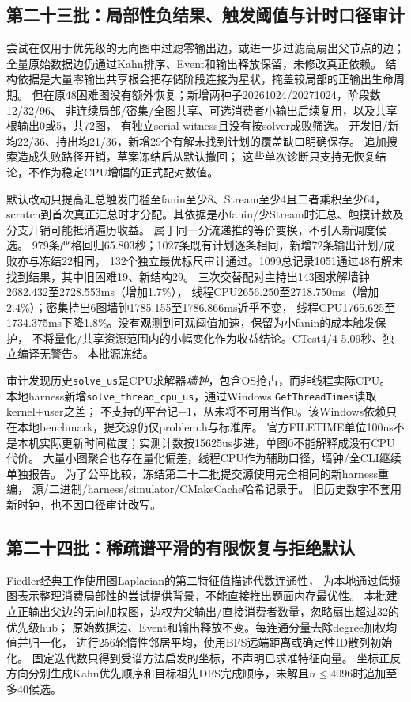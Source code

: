 \documentclass[UTF8,a4paper,11pt,fontset=fandol]{ctexart}
\begin{document}
\subsection{第二十三批：局部性负结果、触发阈值与计时口径审计}
尝试在仅用于优先级的无向图中过滤零输出边，或进一步过滤高扇出父节点的边；
全量原始数据边仍通过Kahn排序、Event和输出释放保留，未修改真正依赖。
结构依据是大量零输出共享根会把存储阶段连接为星状，掩盖较局部的正输出生命周期。
但在原48困难图没有额外恢复；新增两种子20261024/20271024，阶段数12/32/96、
非连续局部/密集/全图共享、可选消费者小输出后续复用，以及共享根输出0或5，共72图，
有独立serial witness且没有按solver成败筛选。
开发旧/新均22/36、持出均21/36，新增29个有解未找到计划的覆盖缺口明确保存。
追加搜索造成失败路径开销，草案冻结后从默认撤回；
这些单次诊断只支持无恢复结论，不作为稳定CPU增幅的正式配对数值。

默认改动只提高汇总触发门槛至fanin至少8、Stream至少4且二者乘积至少64，
scratch到首次真正汇总时才分配。其依据是小fanin/少Stream时汇总、触摸计数及分支开销可能抵消遍历收益。
属于同一分流递推的等价变换，不引入新调度候选。
979条严格回归65.803秒；1027条既有计划逐条相同，新增72条输出计划/成败亦与冻结22相同，
132个独立最优标尺审计通过。1099总记录1051通过48有解未找到结果，其中旧困难19、新结构29。
三次交替配对主持出143图求解墙钟2682.432至2728.553ms（增加1.7\%），
线程CPU2656.250至2718.750ms（增加2.4\%）；密集持出6图墙钟1785.155至1786.866ms近乎不变，
线程CPU1765.625至1734.375ms下降1.8\%。没有观测到可观阈值加速，保留为小fanin的成本触发保护，
不将量化/共享资源范围内的小幅变化作为收益结论。CTest4/4 5.09秒、独立编译无警告。
本批源冻结。

审计发现历史\texttt{solve\_us}是CPU求解器\emph{墙钟}，包含OS抢占，而非线程实际CPU。
本地harness新增\texttt{solve\_thread\_cpu\_us}，通过Windows \texttt{GetThreadTimes}读取kernel+user之差\cite{threadtime}；
不支持的平台记$-1$，从未将不可用当作0。该Windows依赖只在本地benchmark，提交源仍仅problem.h与标准库。
官方FILETIME单位100ns不是本机实际更新时间粒度；实测计数按15625us步进，单图0不能解释成没有CPU代价。
大量小图聚合也存在量化偏差，线程CPU作为辅助口径，墙钟/全CLI继续单独报告。
为了公平比较，冻结第二十二批提交源使用完全相同的新harness重编，
源/二进制/harness/simulator/CMakeCache哈希记录于。
旧历史数字不套用新时钟，也不因口径审计改写。

\subsection{第二十四批：稀疏谱平滑的有限恢复与拒绝默认}
Fiedler经典工作\cite{fiedler}使用图Laplacian的第二特征值描述代数连通性，
为本地通过低频图表示整理消费局部性的尝试提供背景，不能直接推出题面内存最优性。
本批建立正输出父边的无向加权图，边权为父输出/直接消费者数量，忽略扇出超过32的优先级hub；
原始数据边、Event和输出释放不变。每连通分量去除degree加权均值并归一化，
进行256轮惰性邻居平均，使用BFS远端距离或确定性ID散列初始化。
固定迭代数只得到受谱方法启发的坐标，不声明已求准特征向量。
坐标正反方向分别生成Kahn优先顺序和目标祖先DFS完成顺序，未解且$n\le4096$时追加至多40候选。
\end{document}
